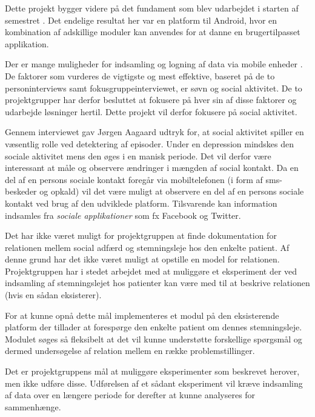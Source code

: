 Dette projekt bygger videre på det fundament som blev udarbejdet i starten af semestret \citefaelles{}.
Det endelige resultat her var en platform til Android, hvor en kombination af adskillige moduler kan anvendes for at danne en brugertilpasset applikation.

Der er mange muligheder  for indsamling og logning af data via mobile enheder .
De faktorer som vurderes de vigtigste og mest effektive, baseret på de to personinterviews samt fokusgruppeinterviewet, er søvn og social aktivitet.
De to projektgrupper har derfor besluttet at fokusere på hver sin af disse faktorer og udarbejde løsninger hertil.
Dette projekt vil derfor fokusere på social aktivitet.

Gennem interviewet gav Jørgen Aagaard udtryk for, at social aktivitet spiller en væsentlig rolle ved detektering af episoder.
Under en depression mindskes den sociale aktivitet mens den øges i en manisk periode.
Det vil derfor være interessant at måle og observere ændringer i mængden af social kontakt.
Da en del af en persons sociale kontakt foregår via mobiltelefonen (i form af sms-beskeder og opkald) vil det være muligt at observere en del af en persons sociale kontakt ved brug af den udviklede platform.
Tilsvarende kan information indsamles fra \textit{sociale applikationer} som fx Facebook og Twitter.

Det har ikke været muligt for projektgruppen at finde dokumentation for relationen mellem social adfærd og stemningsleje hos den enkelte patient.
Af denne grund har det ikke været muligt at opstille en model for relationen.
Projektgruppen har i stedet arbejdet med at muliggøre et eksperiment der ved indsamling af stemningslejet hos patienter kan være med til at beskrive relationen (hvis en sådan eksisterer).

For at kunne opnå dette mål implementeres et modul på den eksisterende platform \citefaelles{} der tillader at forespørge den enkelte patient om dennes stemningsleje.
Modulet søges så fleksibelt at det vil kunne understøtte forskellige spørgsmål og dermed undersøgelse af relation mellem en række problemstillinger.

Det er projektgruppens mål at muliggøre eksperimenter som beskrevet herover, men ikke udføre disse.
Udførelsen af et sådant eksperiment vil kræve indsamling af data over en længere periode for derefter at kunne analyseres for sammenhænge.